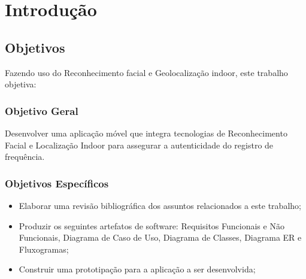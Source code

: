 
\chapter{Introdução}\label{ch:intro}


\section{Objetivos}\label{sec:objetivos}
Fazendo uso do Reconhecimento facial e Geolocalização indoor, este trabalho objetiva:

\subsection{Objetivo Geral}\label{subsec:objetivo-geral}
Desenvolver uma aplicação móvel que integra tecnologias de Reconhecimento Facial e Localização Indoor para assegurar a autenticidade do registro de frequência.

\subsection{Objetivos Específicos}\label{subsec:objetivos-especificos}
\begin{itemize}

    \item Elaborar uma revisão bibliográfica dos assuntos relacionados a este trabalho;
    \item Produzir os seguintes artefatos de software: Requisitos Funcionais e Não Funcionais, Diagrama de Caso de Uso, Diagrama de Classes, Diagrama ER e Fluxogramas;
    \item Construir uma prototipação para a aplicação a ser desenvolvida;

\end{itemize}
